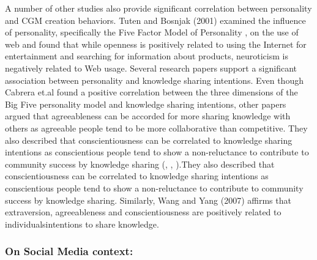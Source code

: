 A number of other studies also provide significant correlation between personality and CGM creation behaviors. Tuten and Bosnjak (2001) examined the influence of personality, specifically the Five Factor Model of Personality \cite{goldberg1990alternative}, on the use of web and found that while openness is positively related to using the Internet for entertainment and searching for information about products, neuroticism is negatively related to Web usage. Several research papers support a significant association between personality and knowledge sharing intentions\cite{cabrera2006determinants}\cite{wang2007personality}\cite{matzler2011personality}\cite{yoo2011influence}. Even though Cabrera et.al found a positive correlation between the three dimensions of the Big Five personality model \cite{goldberg1990alternative} and knowledge sharing intentions, other papers argued that agreeableness can be accorded for more sharing knowledge with others as agreeable people tend to be more collaborative than competitive. They also described that conscientiousness can be correlated to knowledge sharing intentions as conscientious people tend to show a non-reluctance to contribute to community success by knowledge sharing (\cite{matzler2011personality},  \cite{barrick1991big}, \cite{liao2004multilevel}).They also described that conscientiousness can be correlated to knowledge sharing intentions as conscientious people tend to show a non-reluctance to contribute to community success by knowledge sharing. Similarly, Wang and Yang (2007) affirms that extraversion, agreeableness and conscientiousness are positively related to individuals\textquotesingle intentions to share knowledge\cite{wang2007personality}.


\subsubsection{On Social Media context: }\label{3.2}

